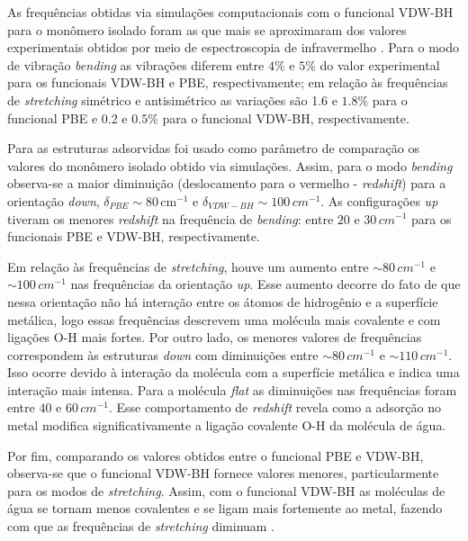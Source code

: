  As frequências obtidas via simulações computacionais com o funcional VDW-BH para o monômero isolado foram as que mais se aproximaram dos valores experimentais obtidos por meio de espectroscopia de infravermelho \cite{ref-modos}. Para o modo de vibração \textit{bending} as vibrações diferem entre $ 4\% $ e $ 5\%$ do valor experimental para os funcionais VDW-BH e PBE, respectivamente; em relação às frequências de \textit{stretching} simétrico e antisimétrico as variações são 1.6 e $1.8\% $ para o funcional PBE e 0.2 e $0.5\% $ para o funcional VDW-BH, respectivamente. 

 Para as estruturas adsorvidas foi usado como parâmetro de comparação os valores do monômero isolado obtido via simulações. Assim, para o modo \textit{bending} observa-se a maior diminuição (deslocamento para o vermelho - \textit{redshift}) para a orientação \textit{down}, $ \delta_{PBE}\sim 80 \,\si{\cm}^{-1}$ e $ \delta_{VDW-BH}\sim 100 \,\si{cm}^{-1}$. As configurações \textit{up} tiveram os menores \textit{redshift} na frequência de \textit{bending}: entre $ 20 $ e $ 30 \,\si{cm}^{-1}$ para os funcionais PBE e VDW-BH, respectivamente.

Em relação às frequências de \textit{stretching}, houve um aumento entre $ \sim 80 \,\si{cm}^{-1}$ e $ \sim 100 \,\si{cm}^{-1}$ nas frequências da orientação \textit{up}. Esse aumento decorre do fato de que nessa orientação não há interação entre os átomos de hidrogênio e a superfície metálica, logo essas frequências descrevem uma molécula mais covalente e com ligações O-H mais fortes. Por outro lado, os menores valores de frequências correspondem às estruturas \textit{down} com diminuições entre $ \sim 80 \,\si{cm}^{-1}$ e $ \sim 110 \,\si{cm}^{-1}$. Isso ocorre devido à interação da molécula com a superfície metálica e indica uma interação mais intensa. Para a molécula \textit{flat} as diminuições nas frequências foram entre $40$ e $ 60 \,\si{cm}^{-1} $. Esse comportamento de \textit{redshift} revela como a adsorção no metal modifica significativamente a ligação covalente O-H da molécula de água. 

 Por fim, comparando os valores obtidos entre o funcional PBE e VDW-BH, observa-se que o funcional VDW-BH fornece valores menores, particularmente para os modos de \textit{stretching}. Assim, com o funcional VDW-BH as moléculas de água se tornam menos covalentes e se ligam mais fortemente ao metal, fazendo com que as frequências de \textit{stretching} diminuam \cite{adrien}.  

